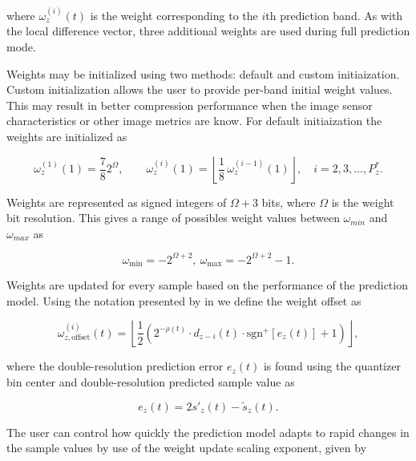 where $\omega^{(i)}_z(t)$ is the weight corresponding to the $i$th prediction band. As with the local difference vector, three additional weights are used during full prediction mode.

Weights may be initialized using two methods: default and custom initiaization. Custom initialization allows the user to provide per-band initial weight values. This may result in better compression performance when the image sensor characteristics or other image metrics are know. For default initiaization the weights are initialized as

\begin{equation}
	\omega_z^{(1)}(1) = \frac{7}{8} 2^{\Omega}, \qquad
	\omega_z^{(i)}(1) = \left\lfloor \frac{1}{8}\, \omega_z^{(i-1)}(1) \right\rfloor,
	\quad i = 2,3,\ldots,P_z^{*}.
	\label{eq:weight-init}
\end{equation}

Weights are represented as signed integers of $\Omega + 3$ bits, where $\Omega$ is the weight bit resolution. This gives a range of possibles weight values between $\omega_{min}$ and $\omega_{max}$ as

\begin{equation}
	\omega_{\mathrm{min}} = -2^{\Omega+2}, \: \omega_{\mathrm{max}} = -2^{\Omega+2} - 1.
	\label{eq:weight-min-max}
\end{equation}

Weights are updated for every sample based on the performance of the prediction model. Using the notation presented by \citeauthor{jiaRemovalFeedbackLoop2025} in \cite{jiaRemovalFeedbackLoop2025} we define the weight offset as

\begin{equation}
	\omega^{(i)}_{z, \text{offset}}(t) = \left\lfloor \frac{1}{2} \left(2^{-\rho(t)} \cdot d_{z-i}(t) \cdot \text{sgn}^+[e_z(t)] + 1 \right) \right\rfloor,
	\label{eq:weight-offset}
\end{equation}

where the double-resolution prediction error $e_z(t)$ is found using the quantizer bin center and double-resolution predicted sample value as

\begin{equation}
	e_z(t) = 2s'_z(t) - \tilde{s}_z(t).
	\label{eq:double-resolution-prediction-error}
\end{equation}

The user can control how quickly the prediction model adapts to rapid changes in the sample values by use of the weight update scaling exponent, given by

